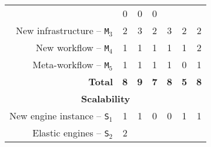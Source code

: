 \documentclass[preprint,3p,twocolumn]{elsarticle}
\begin{document}
\begin{table*}
\begin{tabular}{rcccccc}
                                     & \cellcolor[HTML]{99FF99}0
                                     & \cellcolor[HTML]{99FF99}0
                                     & \cellcolor[HTML]{99FF99}0 \\
New infrastructure -- \texttt{M$_3$} & \cellcolor[HTML]{99FF99}2
                                     & \cellcolor[HTML]{99FF99}3
                                     & \cellcolor[HTML]{99FF99}2
                                     & \cellcolor[HTML]{99FF99}3
                                     & \cellcolor[HTML]{99FF99}2
                                     & \cellcolor[HTML]{99FF99}2 \\
New workflow -- \texttt{M$_4$}       & \cellcolor[HTML]{99FF99}1
                                     & \cellcolor[HTML]{99FF99}1
                                     & \cellcolor[HTML]{99FF99}1
                                     & \cellcolor[HTML]{99FF99}1
                                     & \cellcolor[HTML]{99FF99}1
                                     & \cellcolor[HTML]{99AA99}2 \\
Meta-workflow  -- \texttt{M$_5$}     & \cellcolor[HTML]{99AA99}1
                                     & \cellcolor[HTML]{99AA99}1  
                                     & \cellcolor[HTML]{99AA99}1
                                     & \cellcolor[HTML]{99AA99}1
                                     & \cellcolor[HTML]{99FF99}0
                                     & \cellcolor[HTML]{99AA99}1 \\
\textbf{Total}                       & \cellcolor[HTML]{99AA99}\textbf{8}
                                     & \cellcolor[HTML]{99EE99}\textbf{9}
                                     & \cellcolor[HTML]{99FF99}\textbf{7}
                                     & \cellcolor[HTML]{99EE99}\textbf{8}
                                     & \cellcolor[HTML]{99FF99}\textbf{5}
                                     & \cellcolor[HTML]{99AA99}\textbf{8} \\
\multicolumn{7}{c}{\cellcolor[HTML]{EEEEEE}\textbf{Scalability}}\\
New engine instance -- \texttt{S$_1$}& \cellcolor[HTML]{99AA99}1
                                     & \cellcolor[HTML]{99AA99}1
                                     & \cellcolor[HTML]{99FF99}0
                                     & \cellcolor[HTML]{99FF99}0
                                     & \cellcolor[HTML]{99AA99}1
                                     & \cellcolor[HTML]{99AA99}1 \\
Elastic engines -- \texttt{S$_2$}    & \cellcolor[HTML]{99AA99}2

\end{tabular}
\end{table*}
\end{document}
